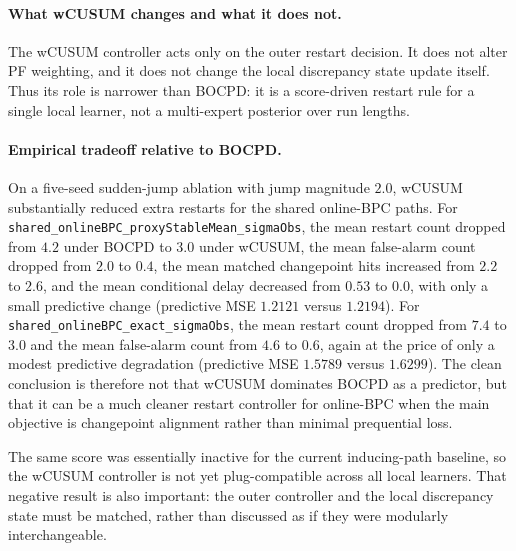 \documentclass{article}
\begin{document}
\paragraph{What wCUSUM changes and what it does not.}
The wCUSUM controller acts only on the outer restart decision. It does not alter PF weighting, and it does not change the local discrepancy state update itself. Thus its role is narrower than BOCPD: it is a score-driven restart rule for a single local learner, not a multi-expert posterior over run lengths.

\paragraph{Empirical tradeoff relative to BOCPD.}
On a five-seed sudden-jump ablation with jump magnitude $2.0$, wCUSUM substantially reduced extra restarts for the shared online-BPC paths. For \texttt{shared\_onlineBPC\_proxyStableMean\_sigmaObs}, the mean restart count dropped from $4.2$ under BOCPD to $3.0$ under wCUSUM, the mean false-alarm count dropped from $2.0$ to $0.4$, the mean matched changepoint hits increased from $2.2$ to $2.6$, and the mean conditional delay decreased from $0.53$ to $0.0$, with only a small predictive change (predictive MSE $1.2121$ versus $1.2194$). For \texttt{shared\_onlineBPC\_exact\_sigmaObs}, the mean restart count dropped from $7.4$ to $3.0$ and the mean false-alarm count from $4.6$ to $0.6$, again at the price of only a modest predictive degradation (predictive MSE $1.5789$ versus $1.6299$). The clean conclusion is therefore not that wCUSUM dominates BOCPD as a predictor, but that it can be a much cleaner restart controller for online-BPC when the main objective is changepoint alignment rather than minimal prequential loss.

The same score was essentially inactive for the current inducing-path baseline, so the wCUSUM controller is not yet plug-compatible across all local learners. That negative result is also important: the outer controller and the local discrepancy state must be matched, rather than discussed as if they were modularly interchangeable.
\end{document}
